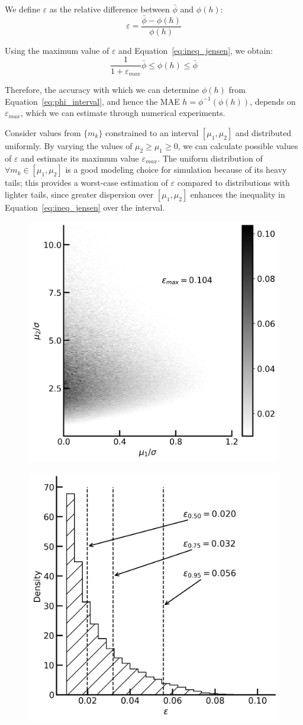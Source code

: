 \documentclass[12pt,a4paper]{article}
\theoremstyle{definition}
\begin{document}
We define $\varepsilon$ as the relative difference between $\bar{\phi}$ and $\phi(h)$:
\begin{equation}
	\varepsilon = \frac{\bar{\phi} - \phi(h)}{\phi(h)}
\end{equation}

Using the maximum value of $\varepsilon$ and Equation~\ref{eq:ineq_jensen}, we obtain:
\begin{equation}
	\frac{1}{1+\varepsilon_{max}}\bar{\phi} \leq \phi(h) \leq \bar{\phi}
	\label{eq:phi_interval}
\end{equation}

Therefore, the accuracy with which we can determine $\phi(h)$ from Equation~\ref{eq:phi_interval}, and hence the MAE $h = \phi^{-1}(\phi(h))$, depends on $\varepsilon_{max}$, which we can estimate through numerical experiments.

Consider values from $\{m_k\}$ constrained to an interval $[\mu_1, \mu_2]$ and distributed uniformly. By varying the values of $\mu_2 \geq \mu_1 \geq 0$, we can calculate possible values of $\varepsilon$ and estimate its maximum value $\varepsilon_{max}$. The uniform distribution of $\forall m_k \in [\mu_1, \mu_2]$ is a good modeling choice for simulation because of its heavy tails; this provides a worst-case estimation of $\varepsilon$ compared to distributions with lighter tails, since greater dispersion over $[\mu_1, \mu_2]$ enhances the inequality in Equation~\ref{eq:ineq_jensen} over the interval.


\begin{figure}[H]
	\centering
	\includegraphics[width=0.5\linewidth]{img/eps_map}
	\caption{}
	\label{fig:eps_map}
\end{figure}

\begin{figure}[H]
	\centering
	\includegraphics[width=0.5\linewidth]{img/eps_distr}
	\caption{}
	\label{fig:eps_distr}
\end{figure}
\end{document}
